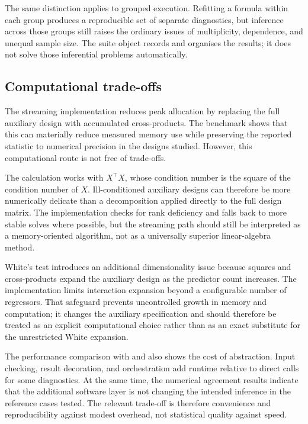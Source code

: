 The same distinction applies to grouped execution. Refitting a formula within
each group produces a reproducible set of separate diagnostics, but inference
across those groups still raises the ordinary issues of multiplicity,
dependence, and unequal sample size. The suite object records and organises the
results; it does not solve those inferential problems automatically.

\subsection{Computational trade-offs}\label{computational-trade-offs}

The streaming implementation reduces peak allocation by replacing the full
auxiliary design with accumulated cross-products. The benchmark shows that this
can materially reduce measured memory use while preserving the reported
statistic to numerical precision in the designs studied. However, this
computational route is not free of trade-offs.

The calculation works with \(X^\top X\), whose condition number is the square of
the condition number of \(X\). Ill-conditioned auxiliary designs can therefore
be more numerically delicate than a decomposition applied directly to the full
design matrix. The implementation checks for rank deficiency and falls back to
more stable solves where possible, but the streaming path should still be
interpreted as a memory-oriented algorithm, not as a universally superior
linear-algebra method.

White's test introduces an additional dimensionality issue because squares and
cross-products expand the auxiliary design as the predictor count increases.
The implementation limits interaction expansion beyond a configurable number of
regressors. That safeguard prevents uncontrolled growth in memory and
computation; it changes the auxiliary specification and should therefore be
treated as an explicit computational choice rather than as an exact substitute
for the unrestricted White expansion.

The performance comparison with  and  also
shows the cost of abstraction. Input checking, result decoration, and
orchestration add runtime relative to direct calls for some diagnostics. At the
same time, the numerical agreement results indicate that the additional
software layer is not changing the intended inference in the reference cases
tested. The relevant trade-off is therefore convenience and reproducibility
against modest overhead, not statistical quality against speed.

